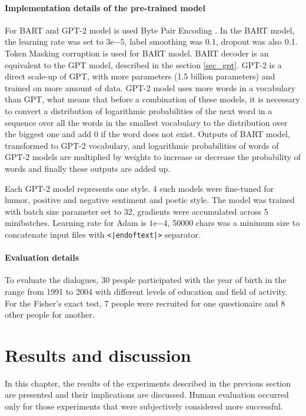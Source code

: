 \subsubsection{Implementation details of the pre-trained model}
For BART and GPT-2 model is used Byte Pair Encoding \cite{sennrich2015neural}. In the BART model, the learning rate \cite{jacobs1988increased} was set to $3\mathrm{e}{-5}$, label smoothing \cite{szegedy2016rethinking} was 0.1, dropout was also 0.1. Token Masking corruption is used for BART model. BART decoder is an equivalent to the GPT model, described in the section \ref{sec_gpt}. GPT-2 is a direct scale-up of GPT, with more parameters (1.5 billion parameters) and trained on more amount of data. GPT-2 model uses more words in a vocabulary than GPT, what means that before a combination of these models, it is necessary to convert a distribution of logarithmic probabilities of the next word in a sequence over all the words in the smallest vocabulary to the distribution over the biggest one and add 0 if the word does not exist. Outputs of BART model, transformed to GPT-2 vocabulary, and logarithmic probabilities of words of GPT-2 models are multiplied by weights to increase or decrease the probability of words and finally these outputs are added up.

Each GPT-2 model represents one style. 4 such models were fine-tuned for humor, positive and negative sentiment and poetic style. The model was trained with batch size parameter set to 32, gradients were accumulated across 5 minibatches. Learning rate for Adam is $1\mathrm{e}{-4}$, 50000 chars was a minimum size to concatenate input files with \texttt{<|endoftext|>} separator. 

\subsubsection{Evaluation details}
To evaluate the dialogues, 30 people participated with the year of birth in the range from 1991 to 2004 with different levels of education and field of activity. For the Fisher's exact test, 7 people were recruited for one questionaire and 8 other people for another. 

\chapter{Results and discussion} \label{results_discuss}
In this chapter, the results of the experiments described in the previous section are presented and their implications are discussed. Human evaluation occurred only for those experiments that were subjectively considered more successful.

